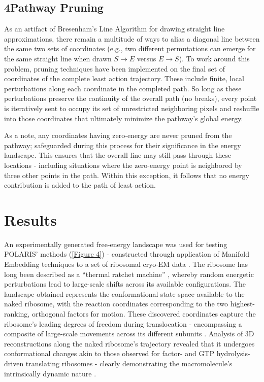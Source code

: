 \documentclass[twocolumn]{biophys-new}
\begin{document}
\subsection*{4\quad Pathway Pruning}

As an artifact of Bresenham's Line Algorithm for drawing straight line approximations, there remain a multitude of ways to alias a diagonal line between the same two sets of coordinates (e.g., two different permutations can emerge for the same straight line when drawn $S\to E$ versus $E\to S$). To work around this problem, pruning techniques have been implemented on the final set of coordinates of the complete least action trajectory. These include finite, local perturbations along each coordinate in the completed path. So long as these perturbations preserve the continuity of the overall path (no breaks), every point is iteratively sent to occupy its set of unrestricted neighboring pixels and reshuffle into those coordinates that ultimately minimize the pathway's global energy.

As a note, any coordinates having zero-energy are never pruned from the pathway; safeguarded during this process for their significance in the energy landscape. This ensures that the overall line may still pass through these locations - including situations where the zero-energy point is neighbored by three other points in the path. Within this exception, it follows that no energy contribution is added to the path of least action.

\section*{Results}

An experimentally generated free-energy landscape was used for testing POLARIS' methods (\autoref{Figure 4}) - constructed through application of Manifold Embedding techniques to a set of ribosomal cryo-EM data \cite{dashti}. The ribosome has long been described as a ``thermal ratchet machine'' \cite{ratchet}, whereby random energetic perturbations lead to large-scale shifts across its available configurations. The landscape obtained represents the conformational state space available to the naked ribosome, with the reaction coordinates corresponding to the two highest-ranking, orthogonal factors for motion. These discovered coordinates capture the ribosome's leading degrees of freedom during translocation - encompassing a composite of large-scale movements across its different subunits \cite{whitford2013, dashti}. Analysis of 3D reconstructions along the naked ribosome's trajectory revealed that it undergoes conformational changes akin to those observed for factor- and GTP hydrolysis-driven translating ribosomes - clearly demonstrating the macromolecule's intrinsically dynamic nature \cite{whitford24}. 
\end{document}
